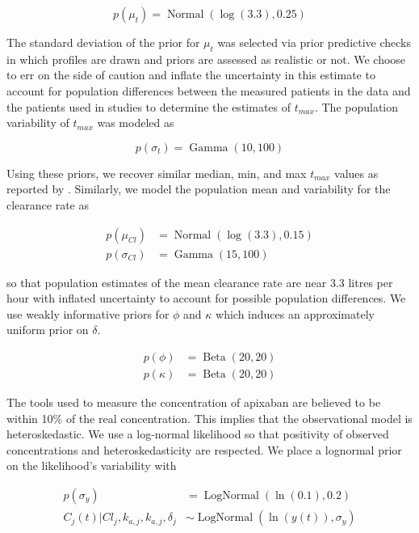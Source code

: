\begin{equation}\label{eq:eq_10}
 p(\mu_t) = \operatorname{Normal}(\log(3.3), 0.25)
\end{equation}

\noindent The standard deviation of the prior for $\mu_t$ was selected via prior predictive checks in which profiles are drawn and priors are assessed as realistic or not.  We choose to err on the side of caution and inflate the uncertainty in this estimate to account for population differences between the measured patients in the data and the patients used in studies to determine the estimates of $t_{\mathit{max}}$. The population variability of $t_{\mathit{max}}$ was modeled as

\begin{equation}\label{eq:eq_11}
p(\sigma_t) = \operatorname{Gamma}(10,100)
\end{equation}

\noindent Using these priors, we recover similar median, min, and max $t_{\mathit{max}}$ values as reported by \cite{Byon2019-gf}. Similarly, we model the population mean and variability for the clearance rate as

\begin{align}
	p(\mu_{\mathit{Cl}}) &= \operatorname{Normal}(\log(3.3), 0.15) \label{eq:eq_12} \\
	p(\sigma_{\mathit{Cl}}) &= \operatorname{Gamma}(15, 100) \label{eq:eq_13}
\end{align}

\noindent so that population estimates of the mean clearance rate are near 3.3 litres per hour with inflated uncertainty to account for possible population differences. We use weakly informative priors for $\phi$ and $\kappa$ which induces an approximately uniform prior on $\delta$.

\begin{align}
	 p(\phi) &= \operatorname{Beta}(20,20) \label{eq:eq_14}\\
	 p(\kappa) &= \operatorname{Beta}(20,20)  \label{eq:eq_15}
\end{align}

The tools used to measure the concentration of apixaban are believed to be within 10\% of the real concentration.  This implies that the observational model is heteroskedastic. We use a log-normal likelihood so that positivity of observed concentrations and heteroskedasticity are respected. We place a lognormal prior on the likelihood’s variability with

\begin{align}
	p(\sigma_y)  &= \operatorname{LogNormal}(\ln(0.1), 0.2) \label{eq:eq_16}\\
	C_{j}(t) \vert \mathit{Cl}_{j}, k_{a,j}, k_{a,j}, \delta_j &\sim \operatorname{LogNormal}(\ln(y(t)), \sigma_y)  \label{eq:eq_17}
\end{align}


